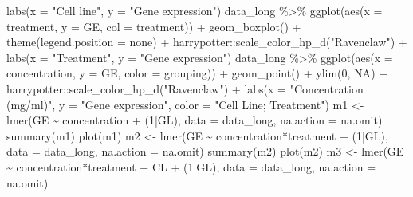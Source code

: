 \documentclass[
  letterpaper,
  DIV=11,
  numbers=noendperiod]{scrartcl}
\newenvironment{Shaded}{\begin{snugshade}}{\end{snugshade}}
\newcommand{\AttributeTok}[1]{\textcolor[rgb]{0.40,0.45,0.13}{#1}}
\newcommand{\ConstantTok}[1]{\textcolor[rgb]{0.56,0.35,0.01}{#1}}
\newcommand{\DecValTok}[1]{\textcolor[rgb]{0.68,0.00,0.00}{#1}}
\newcommand{\FunctionTok}[1]{\textcolor[rgb]{0.28,0.35,0.67}{#1}}
\newcommand{\NormalTok}[1]{\textcolor[rgb]{0.00,0.23,0.31}{#1}}
\newcommand{\OtherTok}[1]{\textcolor[rgb]{0.00,0.23,0.31}{#1}}
\newcommand{\SpecialCharTok}[1]{\textcolor[rgb]{0.37,0.37,0.37}{#1}}
\newcommand{\StringTok}[1]{\textcolor[rgb]{0.13,0.47,0.30}{#1}}
\begin{document}
\begin{Shaded}
\begin{Highlighting}[]
  \FunctionTok{labs}\NormalTok{(}\AttributeTok{x =} \StringTok{"Cell line"}\NormalTok{,}
       \AttributeTok{y =} \StringTok{"Gene expression"}\NormalTok{)}
\NormalTok{data\_long }\SpecialCharTok{\%\textgreater{}\%}
  \FunctionTok{ggplot}\NormalTok{(}\FunctionTok{aes}\NormalTok{(}\AttributeTok{x =}\NormalTok{ treatment, }\AttributeTok{y =}\NormalTok{ GE, }\AttributeTok{col =}\NormalTok{ treatment)) }\SpecialCharTok{+}
  \FunctionTok{geom\_boxplot}\NormalTok{() }\SpecialCharTok{+}
  \FunctionTok{theme}\NormalTok{(}\AttributeTok{legend.position =} \StringTok{\textquotesingle{}none\textquotesingle{}}\NormalTok{) }\SpecialCharTok{+}
\NormalTok{  harrypotter}\SpecialCharTok{::}\FunctionTok{scale\_color\_hp\_d}\NormalTok{(}\StringTok{"Ravenclaw"}\NormalTok{) }\SpecialCharTok{+}
  \FunctionTok{labs}\NormalTok{(}\AttributeTok{x =} \StringTok{"Treatment"}\NormalTok{,}
       \AttributeTok{y =} \StringTok{"Gene expression"}\NormalTok{)}
\NormalTok{data\_long }\SpecialCharTok{\%\textgreater{}\%}
  \FunctionTok{ggplot}\NormalTok{(}\FunctionTok{aes}\NormalTok{(}\AttributeTok{x =}\NormalTok{ concentration, }\AttributeTok{y =}\NormalTok{ GE, }\AttributeTok{color =}\NormalTok{ grouping)) }\SpecialCharTok{+}
  \FunctionTok{geom\_point}\NormalTok{() }\SpecialCharTok{+}
  \FunctionTok{ylim}\NormalTok{(}\DecValTok{0}\NormalTok{, }\ConstantTok{NA}\NormalTok{) }\SpecialCharTok{+}
\NormalTok{  harrypotter}\SpecialCharTok{::}\FunctionTok{scale\_color\_hp\_d}\NormalTok{(}\StringTok{"Ravenclaw"}\NormalTok{) }\SpecialCharTok{+}
  \FunctionTok{labs}\NormalTok{(}\AttributeTok{x =} \StringTok{"Concentration (mg/ml)"}\NormalTok{,}
       \AttributeTok{y =} \StringTok{"Gene expression"}\NormalTok{,}
       \AttributeTok{color =} \StringTok{"Cell Line; Treatment"}\NormalTok{)}
\NormalTok{m1 }\OtherTok{\textless{}{-}} \FunctionTok{lmer}\NormalTok{(GE }\SpecialCharTok{\textasciitilde{}}\NormalTok{ concentration }\SpecialCharTok{+}\NormalTok{ (}\DecValTok{1}\SpecialCharTok{|}\NormalTok{GL), }\AttributeTok{data =}\NormalTok{ data\_long, }\AttributeTok{na.action =}\NormalTok{ na.omit)}
\FunctionTok{summary}\NormalTok{(m1)}
\FunctionTok{plot}\NormalTok{(m1)}
\NormalTok{m2 }\OtherTok{\textless{}{-}} \FunctionTok{lmer}\NormalTok{(GE }\SpecialCharTok{\textasciitilde{}}\NormalTok{ concentration}\SpecialCharTok{*}\NormalTok{treatment }\SpecialCharTok{+}\NormalTok{ (}\DecValTok{1}\SpecialCharTok{|}\NormalTok{GL), }\AttributeTok{data =}\NormalTok{ data\_long, }\AttributeTok{na.action =}\NormalTok{ na.omit)}
\FunctionTok{summary}\NormalTok{(m2)}
\FunctionTok{plot}\NormalTok{(m2)}
\NormalTok{m3 }\OtherTok{\textless{}{-}} \FunctionTok{lmer}\NormalTok{(GE }\SpecialCharTok{\textasciitilde{}}\NormalTok{ concentration}\SpecialCharTok{*}\NormalTok{treatment }\SpecialCharTok{+}\NormalTok{ CL }\SpecialCharTok{+}\NormalTok{ (}\DecValTok{1}\SpecialCharTok{|}\NormalTok{GL), }\AttributeTok{data =}\NormalTok{ data\_long, }\AttributeTok{na.action =}\NormalTok{ na.omit)}

\end{Highlighting}
\end{Shaded}
\end{document}
